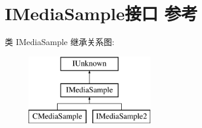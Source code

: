\hypertarget{interface_i_media_sample}{}\section{I\+Media\+Sample接口 参考}
\label{interface_i_media_sample}
类 I\+Media\+Sample 继承关系图\+:\begin{figure}[H]
\begin{center}
\leavevmode
\includegraphics[height=3.000000cm]{interface_i_media_sample}
\end{center}
\end{figure}

